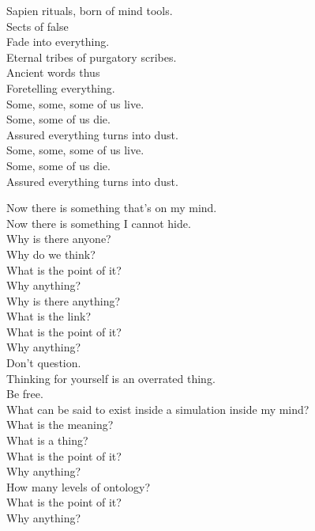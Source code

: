 Sapien rituals, born of mind tools. \\
Sects of false  \\
Fade into everything. \\
Eternal tribes of purgatory scribes. \\
Ancient words thus \\
Foretelling everything. \\

Some, some, some of us live. \\
Some, some of us die. \\
Assured everything turns into dust. \\

Some, some, some of us live. \\
Some, some of us die. \\
Assured everything turns into dust. \\





Now there is something that's on my mind. \\
Now there is something I cannot hide. \\

Why is there anyone? \\
Why do we think? \\
What is the point of it? \\
Why anything? \\
Why is there anything? \\
What is the link? \\
What is the point of it? \\
Why anything? \\

Don't question. \\
Thinking for yourself is an overrated thing. \\
Be free. \\

What can be said to exist inside a simulation inside my mind? \\

What is the meaning? \\
What is a thing? \\
What is the point of it? \\
Why anything? \\
How many levels of ontology? \\
What is the point of it? \\
Why anything? \\

